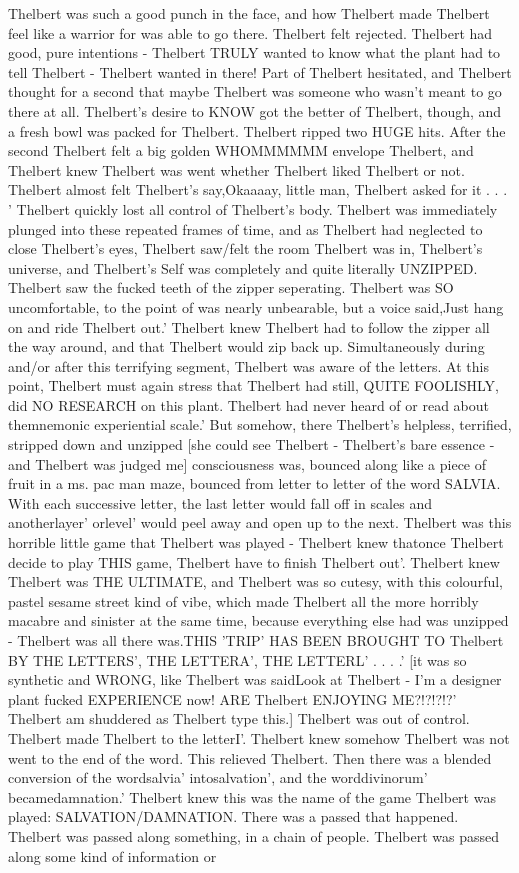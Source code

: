 \documentclass[12pt]{book}
\begin{document}
Thelbert was such a good punch in the face, and how Thelbert made Thelbert feel like a warrior for was able to go there. Thelbert felt rejected. Thelbert had good, pure intentions - Thelbert TRULY wanted to know what the plant had to tell Thelbert - Thelbert wanted in there! Part of Thelbert hesitated, and Thelbert thought for a second that maybe Thelbert was someone who wasn't meant to go there at all. Thelbert's desire to KNOW got the better of Thelbert, though, and a fresh bowl was packed for Thelbert. Thelbert ripped two HUGE hits. After the second Thelbert felt a big golden WHOMMMMMM envelope Thelbert, and Thelbert knew Thelbert was went whether Thelbert liked Thelbert or not. Thelbert almost felt Thelbert's say,Okaaaay, little man, Thelbert asked for it . . .  ' Thelbert quickly lost all control of Thelbert's body. Thelbert was immediately plunged into these repeated frames of time, and as Thelbert had neglected to close Thelbert's eyes, Thelbert saw/felt the room Thelbert was in, Thelbert's universe, and Thelbert's Self was completely and quite literally UNZIPPED. Thelbert saw the fucked teeth of the zipper seperating. Thelbert was SO uncomfortable, to the point of was nearly unbearable, but a voice said,Just hang on and ride Thelbert out.' Thelbert knew Thelbert had to follow the zipper all the way around, and that Thelbert would zip back up. Simultaneously during and/or after this terrifying segment, Thelbert was aware of the letters. At this point, Thelbert must again stress that Thelbert had still, QUITE FOOLISHLY, did NO RESEARCH on this plant. Thelbert had never heard of or read about themnemonic experiential scale.' But somehow, there Thelbert's helpless, terrified, stripped down and unzipped [she could see Thelbert - Thelbert's bare essence - and Thelbert was judged me] consciousness was, bounced along like a piece of fruit in a ms. pac man maze, bounced from letter to letter of the word SALVIA. With each successive letter, the last letter would fall off in scales and anotherlayer' orlevel' would peel away and open up to the next. Thelbert was this horrible little game that Thelbert was played - Thelbert knew thatonce Thelbert decide to play THIS game, Thelbert have to finish Thelbert out'. Thelbert knew Thelbert was THE ULTIMATE, and Thelbert was so cutesy, with this colourful, pastel sesame street kind of vibe, which made Thelbert all the more horribly macabre and sinister at the same time, because everything else had was unzipped - Thelbert was all there was.THIS 'TRIP' HAS BEEN BROUGHT TO Thelbert BY THE LETTERS', THE LETTERA', THE LETTERL' . . .  .' [it was so synthetic and WRONG, like Thelbert was saidLook at Thelbert - I'm a designer plant fucked EXPERIENCE now! ARE Thelbert ENJOYING ME?!?!?!?' Thelbert am shuddered as Thelbert type this.] Thelbert was out of control. Thelbert made Thelbert to the letterI'. Thelbert knew somehow Thelbert was not went to the end of the word. This relieved Thelbert. Then there was a blended conversion of the wordsalvia' intosalvation', and the worddivinorum' becamedamnation.' Thelbert knew this was the name of the game Thelbert was played: SALVATION/DAMNATION. There was a passed that happened. Thelbert was passed along something, in a chain of people. Thelbert was passed along some kind of information or 
\end{document}
